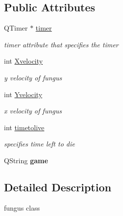 \subsection*{Public Attributes}
\begin{DoxyCompactItemize}
\item 
\hypertarget{classfungus_ab537a12540fff0570026e58b48eec29d}{Q\-Timer $\ast$ \hyperlink{classfungus_ab537a12540fff0570026e58b48eec29d}{timer}}\label{classfungus_ab537a12540fff0570026e58b48eec29d}

\begin{DoxyCompactList}\small\item\em timer attribute that specifies the timer \end{DoxyCompactList}\item 
\hypertarget{classfungus_a41c3791a53d9f8f137c5c519d0cd0742}{int \hyperlink{classfungus_a41c3791a53d9f8f137c5c519d0cd0742}{Xvelocity}}\label{classfungus_a41c3791a53d9f8f137c5c519d0cd0742}

\begin{DoxyCompactList}\small\item\em y velocity of fungus \end{DoxyCompactList}\item 
\hypertarget{classfungus_acf88a26542582ba595fce0d65d2c8f16}{int \hyperlink{classfungus_acf88a26542582ba595fce0d65d2c8f16}{Yvelocity}}\label{classfungus_acf88a26542582ba595fce0d65d2c8f16}

\begin{DoxyCompactList}\small\item\em x velocity of fungus \end{DoxyCompactList}\item 
\hypertarget{classfungus_a3a90ae49c71638d579aadd54c9a8424e}{int \hyperlink{classfungus_a3a90ae49c71638d579aadd54c9a8424e}{timetolive}}\label{classfungus_a3a90ae49c71638d579aadd54c9a8424e}

\begin{DoxyCompactList}\small\item\em specifies time left to die \end{DoxyCompactList}\item 
\hypertarget{classfungus_af5778c05c2d02dad47586b22b35cd4fd}{Q\-String {\bfseries game}}\label{classfungus_af5778c05c2d02dad47586b22b35cd4fd}

\end{DoxyCompactItemize}


\subsection{Detailed Description}
fungus class 

